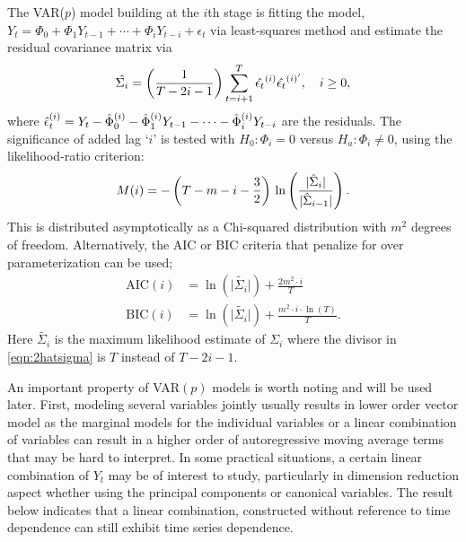 The VAR($p$) model building at the $i$th stage is fitting the model, $Y_t= \Phi_0 + \Phi_1 Y_{t-1} + \cdots + \Phi_i Y_{t-i} + \epsilon_t$ via least-squares method and estimate the residual covariance matrix via
	\begin{equation} \label{eqn:2hatsigma}
	\hat{\Sigma_i} = \left( \frac{1}{T-2i-1} \right) \sum_{t=i+1}^{T}\Hat{\epsilon_t}^{(i)}{{\hat{\epsilon_t}^{(i)^\prime}}}, \quad i \geq 0,
	\end{equation}
where $ \Hat{\epsilon}_t^{(i)}= Y_t - \Hat{\Phi}_0^{(i)} - \Hat{\Phi}_1^{(i)}Y_{t-1} - \cdots - \Hat{\Phi}_i^{(i)}Y_{t-i}$ are the residuals. The significance of added lag `$i$' is tested with $H_0: \Phi_i= 0$ versus $H_a: \Phi_i \neq 0$, using the likelihood-ratio criterion:
	\begin{equation} \label{eqn:2mi}
	M(i)= -\left(T - m - i - \frac{3}{2}\right)\, \ln\left( \frac{\lvert \Hat{\Sigma}_i \rvert}{\lvert \Hat{\Sigma}_{i-1} \rvert}\right).
	\end{equation}
This is distributed asymptotically as a Chi-squared distribution with $m^2$ degrees of freedom. Alternatively, the AIC or BIC criteria that penalize for over parameterization can be used; 
	\begin{equation} \label{eqn:2aicbic}
	\begin{split}
	\text{AIC}(i)&= \ln\left(\lvert\tilde{\Sigma_i} \rvert \right)+\frac{2m^2 \cdot i}{T} \\
	\text{BIC}(i)&= \ln\left( \lvert \tilde{\Sigma_i} \rvert \right)+\frac{m^2 \cdot i \cdot \ln(T)}{T}.
	\end{split}
	\end{equation}
Here $\tilde{\Sigma_i}$ is the maximum likelihood estimate of $\Sigma_i$ where the divisor in \eqref{eqn:2hatsigma} is $T$ instead of $T - 2i - 1$.


An important property of VAR$(p)$ models is worth noting and will be used later. First, modeling several variables jointly usually results in lower order vector model as the marginal models for the individual variables or a linear combination of variables can result in a higher order of autoregressive moving average terms that may be hard to interpret. In some practical situations, a certain linear combination of $Y_t$ may be of interest to study, particularly in dimension reduction aspect whether using the principal components or canonical variables. The result below indicates that a linear combination, constructed without reference to time dependence can still exhibit time series dependence. 


